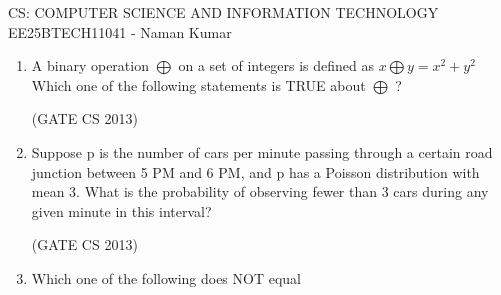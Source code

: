 \documentclass[a4paper, 11pt]{article}
\begin{document}
\begin{center}
    \huge{CS: COMPUTER SCIENCE AND INFORMATION TECHNOLOGY}\\
    \large{EE25BTECH11041 - Naman Kumar}
\end{center}
 \begin{enumerate}
     \item A binary operation $\bigoplus$ on a set of integers is defined as $x\bigoplus y=x^2+y^2$ Which one of the following statements is TRUE about $\bigoplus$ ?
    \begin{enumerate}
    \end{enumerate}

    \hfill (GATE CS 2013)
    
    \item Suppose p is the number of cars per minute passing through a certain road junction between 5 PM and 6 PM, and p has a Poisson distribution with mean 3. What is the probability of observing fewer than 3 cars during any given minute in this interval?
    \begin{enumerate}
    \end{enumerate}
    
    \hfill (GATE CS 2013)
    
    \item Which one of the following does NOT equal
    \begin{enumerate}
\end{enumerate}
\end{enumerate}
\end{document}
